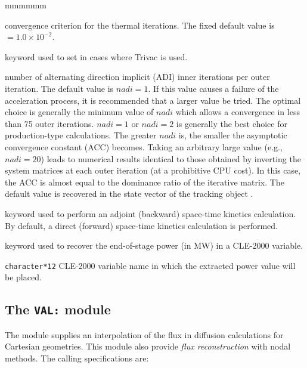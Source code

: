 \begin{ListeDeDescription}{mmmmmm}
\item[\dusa{epsthr}] convergence criterion for the thermal iterations. The
fixed default value is  $=1.0\times 10^{-2}$.

\item[\moc{ADI}] keyword used to set  in cases where Trivac is used.

\item[\dusa{nadi}] number of alternating direction implicit  (ADI) inner
iterations per outer iteration. The default value is $nadi=1$. If this value causes a failure of the acceleration process, it is recommended that a larger value be tried. The optimal
choice is generally the minimum value of $nadi$ which allows a convergence in
less than 75 outer iterations. $nadi=1$ or $nadi=2$ is generally the best
choice for production-type calculations. The greater $nadi$ is, the smaller 
the asymptotic convergence constant (ACC) becomes. Taking an arbitrary large
value (e.g., $nadi=20$) leads to numerical results identical to those obtained by
inverting the system matrices at each
outer iteration (at a prohibitive CPU cost). In this case, the ACC is almost
equal to the dominance ratio of the iterative matrix. The default value is
recovered in the state vector of the {\sc tracking} object .

\item[\moc{ADJ}] keyword used to perform an adjoint (backward) space-time kinetics calculation. By default, a direct (forward) space-time kinetics calculation
is performed.

\item[\moc{PICK}]  keyword used to recover the end-of-stage power (in MW) in a CLE-2000 variable.

\item[\dusa{power\_out}] \texttt{character*12} CLE-2000 variable name in which the extracted power value will be placed.

\end{ListeDeDescription}
\clearpage


\subsection{The {\tt VAL:} module}\label{sect:VALData}

The  module supplies an interpolation of the flux in diffusion calculations for
Cartesian geometries. This module also provide {\sl flux reconstruction} with nodal methods. The calling specifications are:

